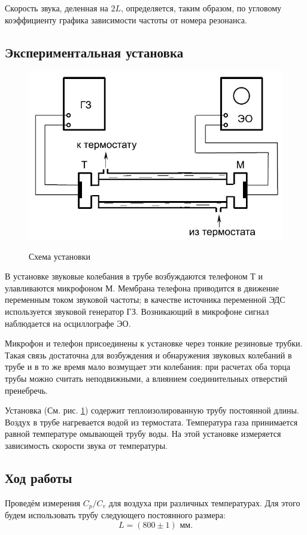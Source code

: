 \documentclass[12pt,a4paper]{article}
\newcommand{\figref}[1]{(См. рис. \ref{#1})}
\begin{document}
Скорость звука, деленная на $2L$, определяется, таким образом, по угловому коэффициенту графика зависимости частоты от номера резонанса.


\subsection*{Экспериментальная установка}

\begin{figure}[h]
	\caption{Схема установки}
	\includegraphics[scale=0.65]{res/scheme2.jpg}
	\label{scheme2}
\end{figure}

В установке звуковые колебания в трубе возбуждаются телефоном Т и улавливаются микрофоном М.
Мембрана телефона приводится в движение переменным током звуковой частоты; в качестве источника переменной ЭДС используется звуковой генератор ГЗ.
Возникающий в микрофоне сигнал наблюдается на осциллографе ЭО.

Микрофон и телефон присоединены к установке через тонкие резиновые трубки.
Такая связь достаточна для возбуждения и обнаружения звуковых колебаний в трубе и в то же время мало возмущает эти колебания: при расчетах оба торца трубы можно считать неподвижными, а влиянием соединительных отверстий пренебречь.

Установка \figref{scheme2} содержит теплоизолированную трубу постоянной длины.
Воздух в трубе нагревается водой из термостата.
Температура газа принимается равной температуре омывающей трубу воды.
На этой установке измеряется зависимость скорости звука от температуры.




\subsection*{Ход работы}
Проведём измерения $C_p/C_v$ для воздуха при различных температурах.
Для этого будем использовать трубу следующего постоянного размера:
$$L = (800 \pm 1) \text{ мм}.$$
\end{document}
